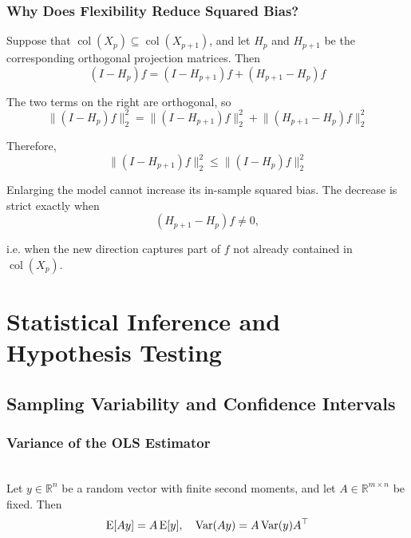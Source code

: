 \subsubsection{Why Does Flexibility Reduce Squared Bias?}
Suppose that $\operatorname{col}(X_p) \subseteq \operatorname{col}(X_{p+1})$, and let $H_p$ and $H_{p+1}$ be the corresponding orthogonal projection matrices. Then
\begin{equation*}
    (I-H_p)f = (I-H_{p+1})f + (H_{p+1}-H_p)f
\end{equation*}

The two terms on the right are orthogonal, so
\begin{equation*}
    \lVert (I-H_p)f \rVert_2^2 = \lVert (I-H_{p+1})f \rVert_2^2 + \lVert (H_{p+1}-H_p)f \rVert_2^2
\end{equation*}

Therefore,
\begin{equation*}
    \lVert (I-H_{p+1})f \rVert_2^2 \leq \lVert (I-H_p)f \rVert_2^2
\end{equation*}

Enlarging the model cannot increase its in-sample squared bias. The decrease is strict exactly when
\begin{equation*}
    (H_{p+1}-H_p)f \neq 0,
\end{equation*}

i.e. when the new direction captures part of $f$ not already contained in $\operatorname{col}(X_p)$.


\section{Statistical Inference and Hypothesis Testing}

\subsection{Sampling Variability and Confidence Intervals}

\subsubsection{Variance of the OLS Estimator}

\begin{lemma} \leavevmode\\
    Let $y \in \mathbb{R}^n$ be a random vector with finite second moments, and let $A \in \mathbb{R}^{m\times n}$ be fixed. Then
    \begin{equation*}
        \operatorname{E}[Ay] = A\operatorname{E}[y], \quad \operatorname{Var}(Ay) = A\operatorname{Var}(y)A^\top
    \end{equation*}
\end{lemma}

